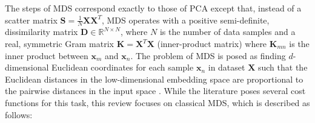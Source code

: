 The steps of MDS correspond exactly to those of PCA except that, instead of a scatter matrix $\bm{S}=\frac{1}{N}\bm{X}\bm{X}^{T}$, MDS operates with a positive semi-definite, dissimilarity matrix $\bm{D} \in \mathbb{R}^{N \times N}$, where $N$ is the number of data samples and a real, symmetric Gram matrix $\bm{K} = \bm{X}^{T}\bm{X}$ (inner-product matrix) where $\bm{K}_{mn}$ is the inner product between $\bm{x}_{m}$ and $\bm{x}_{n}$.  The problem of MDS is posed as finding $d$-dimensional Euclidean coordinates for each sample $\bm{x}_{n}$ in dataset $\bm{X}$ such that the Euclidean distances in the low-dimensional embedding space are proportional to the pairwise distances in the input space \citep{Thorstensen2009ManifoldThesis,Sorzano2014DRReview}. While the literature poses several cost functions for this task, this review focuses on classical MDS, which is described as follows:

